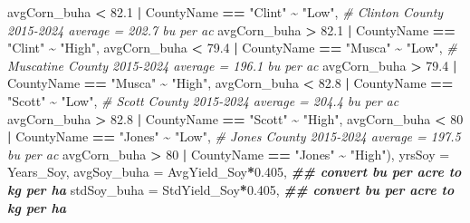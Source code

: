 \documentclass[
]{article}
\newenvironment{Shaded}{\begin{snugshade}}{\end{snugshade}}
\newcommand{\AttributeTok}[1]{\textcolor[rgb]{0.13,0.29,0.53}{#1}}
\newcommand{\CommentTok}[1]{\textcolor[rgb]{0.56,0.35,0.01}{\textit{#1}}}
\newcommand{\DecValTok}[1]{\textcolor[rgb]{0.00,0.00,0.81}{#1}}
\newcommand{\DocumentationTok}[1]{\textcolor[rgb]{0.56,0.35,0.01}{\textbf{\textit{#1}}}}
\newcommand{\FloatTok}[1]{\textcolor[rgb]{0.00,0.00,0.81}{#1}}
\newcommand{\NormalTok}[1]{#1}
\newcommand{\SpecialCharTok}[1]{\textcolor[rgb]{0.81,0.36,0.00}{\textbf{#1}}}
\newcommand{\StringTok}[1]{\textcolor[rgb]{0.31,0.60,0.02}{#1}}
\begin{document}
\begin{Shaded}
\begin{Highlighting}[]
\NormalTok{                                    avgCorn\_buha }\SpecialCharTok{\textless{}} \FloatTok{82.1} \SpecialCharTok{|}\NormalTok{ CountyName }\SpecialCharTok{==} \StringTok{"Clint"} \SpecialCharTok{\textasciitilde{}} \StringTok{"Low"}\NormalTok{, }\CommentTok{\# Clinton County 2015{-}2024 average = 202.7 bu per ac}
\NormalTok{                                    avgCorn\_buha }\SpecialCharTok{\textgreater{}} \FloatTok{82.1} \SpecialCharTok{|}\NormalTok{ CountyName }\SpecialCharTok{==} \StringTok{"Clint"} \SpecialCharTok{\textasciitilde{}} \StringTok{"High"}\NormalTok{,}
\NormalTok{                                    avgCorn\_buha }\SpecialCharTok{\textless{}} \FloatTok{79.4} \SpecialCharTok{|}\NormalTok{ CountyName }\SpecialCharTok{==} \StringTok{"Musca"} \SpecialCharTok{\textasciitilde{}} \StringTok{"Low"}\NormalTok{, }\CommentTok{\# Muscatine County 2015{-}2024 average = 196.1 bu per ac}
\NormalTok{                                    avgCorn\_buha }\SpecialCharTok{\textgreater{}} \FloatTok{79.4} \SpecialCharTok{|}\NormalTok{ CountyName }\SpecialCharTok{==} \StringTok{"Musca"} \SpecialCharTok{\textasciitilde{}} \StringTok{"High"}\NormalTok{,}
\NormalTok{                                    avgCorn\_buha }\SpecialCharTok{\textless{}} \FloatTok{82.8} \SpecialCharTok{|}\NormalTok{ CountyName }\SpecialCharTok{==} \StringTok{"Scott"} \SpecialCharTok{\textasciitilde{}} \StringTok{"Low"}\NormalTok{, }\CommentTok{\# Scott County 2015{-}2024 average = 204.4 bu per ac}
\NormalTok{                                    avgCorn\_buha }\SpecialCharTok{\textgreater{}} \FloatTok{82.8} \SpecialCharTok{|}\NormalTok{ CountyName }\SpecialCharTok{==} \StringTok{"Scott"} \SpecialCharTok{\textasciitilde{}} \StringTok{"High"}\NormalTok{,}
\NormalTok{                                    avgCorn\_buha }\SpecialCharTok{\textless{}} \DecValTok{80} \SpecialCharTok{|}\NormalTok{ CountyName }\SpecialCharTok{==} \StringTok{"Jones"} \SpecialCharTok{\textasciitilde{}} \StringTok{"Low"}\NormalTok{, }\CommentTok{\# Jones County 2015{-}2024 average = 197.5 bu per ac}
\NormalTok{                                    avgCorn\_buha }\SpecialCharTok{\textgreater{}} \DecValTok{80} \SpecialCharTok{|}\NormalTok{ CountyName }\SpecialCharTok{==} \StringTok{"Jones"} \SpecialCharTok{\textasciitilde{}} \StringTok{"High"}\NormalTok{),}
         \AttributeTok{yrsSoy =}\NormalTok{ Years\_Soy,}
         \AttributeTok{avgSoy\_buha =}\NormalTok{ AvgYield\_Soy}\SpecialCharTok{*}\FloatTok{0.405}\NormalTok{, }\DocumentationTok{\#\# convert bu per acre to kg per ha}
         \AttributeTok{stdSoy\_buha =}\NormalTok{ StdYield\_Soy}\SpecialCharTok{*}\FloatTok{0.405}\NormalTok{, }\DocumentationTok{\#\# convert bu per acre to kg per ha}

\end{Highlighting}
\end{Shaded}
\end{document}
